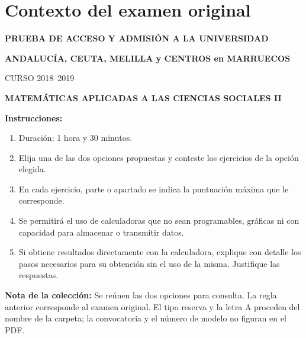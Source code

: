 \section*{Contexto del examen original}
\textbf{PRUEBA DE ACCESO Y ADMISIÓN A LA UNIVERSIDAD}\par
\textbf{ANDALUCÍA, CEUTA, MELILLA y CENTROS en MARRUECOS}\par
CURSO 2018--2019\par
\textbf{MATEMÁTICAS APLICADAS A LAS CIENCIAS SOCIALES II}

\textbf{Instrucciones:}
\begin{enumerate}[label=\textbf{\alph*)}]
  \item Duración: 1 hora y 30 minutos.
  \item Elija una de las dos opciones propuestas y conteste los ejercicios de la opción elegida.
  \item En cada ejercicio, parte o apartado se indica la puntuación máxima que le corresponde.
  \item Se permitirá el uso de calculadoras que no sean programables, gráficas ni con capacidad para almacenar o transmitir datos.
  \item Si obtiene resultados directamente con la calculadora, explique con detalle los pasos necesarios para su obtención sin el uso de la misma. Justifique las respuestas.
\end{enumerate}
\noindent\textbf{Nota de la colección:} Se reúnen las dos opciones para consulta.
La regla anterior corresponde al examen original. El tipo reserva y la letra A
proceden del nombre de la carpeta; la convocatoria y el número de modelo no figuran en el PDF.
\par\medskip
